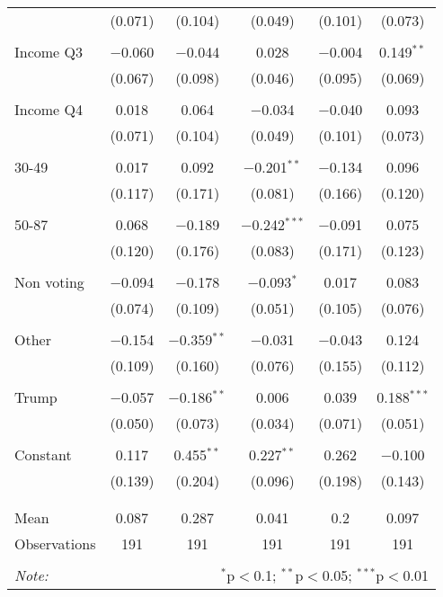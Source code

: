 \begin{tabular}{@{\extracolsep{5pt}}lccccc}
  & (0.071) & (0.104) & (0.049) & (0.101) & (0.073) \\ 
  & & & & & \\ 
 Income Q3 & $-$0.060 & $-$0.044 & 0.028 & $-$0.004 & 0.149$^{**}$ \\ 
  & (0.067) & (0.098) & (0.046) & (0.095) & (0.069) \\ 
  & & & & & \\ 
 Income Q4 & 0.018 & 0.064 & $-$0.034 & $-$0.040 & 0.093 \\ 
  & (0.071) & (0.104) & (0.049) & (0.101) & (0.073) \\ 
  & & & & & \\ 
 30-49 & 0.017 & 0.092 & $-$0.201$^{**}$ & $-$0.134 & 0.096 \\ 
  & (0.117) & (0.171) & (0.081) & (0.166) & (0.120) \\ 
  & & & & & \\ 
 50-87 & 0.068 & $-$0.189 & $-$0.242$^{***}$ & $-$0.091 & 0.075 \\ 
  & (0.120) & (0.176) & (0.083) & (0.171) & (0.123) \\ 
  & & & & & \\ 
 Non voting & $-$0.094 & $-$0.178 & $-$0.093$^{*}$ & 0.017 & 0.083 \\ 
  & (0.074) & (0.109) & (0.051) & (0.105) & (0.076) \\ 
  & & & & & \\ 
 Other & $-$0.154 & $-$0.359$^{**}$ & $-$0.031 & $-$0.043 & 0.124 \\ 
  & (0.109) & (0.160) & (0.076) & (0.155) & (0.112) \\ 
  & & & & & \\ 
 Trump & $-$0.057 & $-$0.186$^{**}$ & 0.006 & 0.039 & 0.188$^{***}$ \\ 
  & (0.050) & (0.073) & (0.034) & (0.071) & (0.051) \\ 
  & & & & & \\ 
 Constant & 0.117 & 0.455$^{**}$ & 0.227$^{**}$ & 0.262 & $-$0.100 \\ 
  & (0.139) & (0.204) & (0.096) & (0.198) & (0.143) \\ 
  & & & & & \\ 
\hline \\[-1.8ex] 
Mean & 0.087 & 0.287 & 0.041 & 0.2 & 0.097 \\ 
Observations & 191 & 191 & 191 & 191 & 191 \\ 
\hline 
\hline \\[-1.8ex] 
\textit{Note:}  & \multicolumn{5}{r}{$^{*}$p$<$0.1; $^{**}$p$<$0.05; $^{***}$p$<$0.01} \\ 
\end{tabular} 
